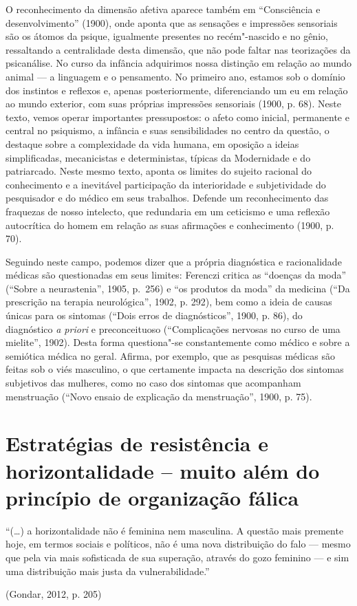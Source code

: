 O reconhecimento da dimensão afetiva aparece também em ``Consciência e
desenvolvimento'' (1900), onde aponta que as sensações e impressões
sensoriais são os átomos da psique, igualmente presentes no
recém"-nascido e no gênio, ressaltando a centralidade desta dimensão, que
não pode faltar nas teorizações da psicanálise. No curso da infância
adquirimos nossa distinção em relação ao mundo animal --- a linguagem e o
pensamento. No primeiro ano, estamos sob o domínio dos instintos e
reflexos e, apenas posteriormente, diferenciando um eu em relação ao
mundo exterior, com suas próprias impressões sensoriais (1900, p. 68).
Neste texto, vemos operar importantes pressupostos: o afeto como
inicial, permanente e central no psiquismo, a infância e suas
sensibilidades no centro da questão, o destaque sobre a complexidade da
vida humana, em oposição a ideias simplificadas, mecanicistas e
deterministas, típicas da Modernidade e do patriarcado. Neste mesmo
texto, aponta os limites do sujeito racional do conhecimento e a
inevitável participação da interioridade e subjetividade do pesquisador
e do médico em seus trabalhos. Defende um reconhecimento das fraquezas
de nosso intelecto, que redundaria em um ceticismo e uma reflexão
autocrítica do homem em relação as suas afirmações e conhecimento (1900, p. 70).

Seguindo neste campo, podemos dizer que a própria diagnóstica e
racionalidade médicas são questionadas em seus limites: Ferenczi critica
as ``doenças da moda'' (``Sobre a neurastenia'', 1905, p.~256) e ``os
produtos da moda'' da medicina (``Da prescrição na terapia neurológica'',
1902, p. 292), bem como a ideia de causas únicas para os sintomas (``Dois
erros de diagnósticos'', 1900, p. 86), do diagnóstico \emph{a priori} e
preconceituoso (``Complicações nervosas no curso de uma mielite'', 1902).
Desta forma questiona"-se constantemente como médico e sobre a semiótica
médica no geral. Afirma, por exemplo, que as pesquisas médicas são
feitas sob o viés masculino, o que certamente impacta na descrição dos
sintomas subjetivos das mulheres, como no caso dos sintomas que
acompanham menstruação (``Novo ensaio de explicação da menstruação'', 1900,
p. 75).

\section{Estratégias de resistência e horizontalidade -- muito além do
princípio de organização fálica }

\epigraph{``(\ldots{}) a horizontalidade não é feminina nem masculina.
A questão mais premente hoje, em termos sociais e políticos,
não é uma nova distribuição do falo --- mesmo que pela
via mais sofisticada de sua superação, através do gozo feminino
--- e sim uma distribuição mais justa da vulnerabilidade.''}{(Gondar, 2012, p. 205)}

